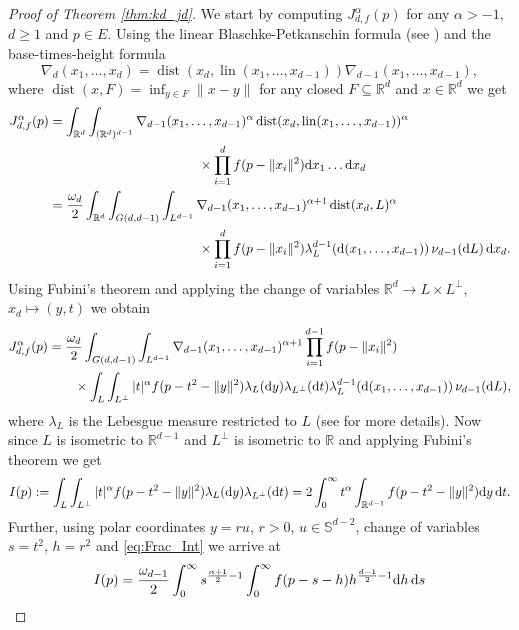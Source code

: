 \documentclass[11pt,a4paper]{article}
\theoremstyle{plain}
\theoremstyle{definition}
\theoremstyle{remark}
\newcommand{\dist}{\mathop{\mathrm{dist}}\nolimits}
\def\RR{\mathbb{R}}
\def\SS{\mathbb{S}}
\newcommand{\dd}{{\rm d}}
\newcommand{\lin}{\mathop{\mathrm{lin}}\nolimits}
\begin{document}
\begin{proof}[Proof of Theorem \ref{thm:kd_jd}]
    We start by computing $J_{d,f}^{\alpha}(p)$ for any $\alpha>-1$, $d\ge 1$ and $p\in E$. Using the linear Blaschke-Petkanschin formula (see \cite[Theorem 7.2.1]{SW}) and the base-times-height formula 
    \[
        \nabla_d(x_1,\ldots,x_d)=\dist(x_d,\lin(x_1,\ldots,x_{d-1}))\nabla_{d-1}(x_1,\ldots,x_{d-1}),
    \]
    where $\dist(x, F)=\inf_{y\in F}\|x-y\|$ for any closed $F\subseteq \RR^d$ and $x\in\RR^d$ we get
    \begin{align*}
        J_{d,f}^{\alpha}(p)
        &= \int_{\RR^d} \int_{(\RR^d)^{d-1}} \nabla_{d-1}(x_1,\dots,x_{d-1})^\alpha \dist(x_{d},\lin(x_1,\dots,x_{d-1}))^{\alpha} \\ &\hspace{4cm} \times \prod_{i=1}^{d}f(p-\|x_i\|^2) \dd x_1 \dots \dd x_d\\
        &= {\omega_d\over 2}\int_{\RR^d} \int_{G(d,d-1)}\int_{L^{d-1}} \nabla_{d-1}(x_1,\dots,x_{d-1})^{\alpha+1} \dist(x_{d},L)^{\alpha} \\ &\hspace{4cm} \times \prod_{i=1}^{d}f(p-\|x_i\|^2)\lambda_L^{d-1}(\dd (x_1,\dots,x_{d-1}))\,\nu_{d-1}(\dd L)\, \dd x_d.
    \end{align*}
    Using Fubini's theorem and applying the change of variables $\RR^d\to L\times L^{\perp}$, $x_d\mapsto (y,t)$ we obtain 
    \begin{align}\label{eq:29.05.24_1}        
        J_{d,f}^{\alpha}(p) &= {\omega_d\over 2}\int_{G(d,d-1)}\int_{L^{d-1}}\nabla_{d-1}(x_1,\dots,x_{d-1})^{\alpha+1} \prod_{i=1}^{d-1}f(p-\|x_i\|^2) \notag\\ 
        &\qquad \times \int_{L}\int_{L^{\perp}} |t|^{\alpha}f(p-t^2-\|y\|^2)\lambda_{L}(\dd y) \lambda_{L^{\perp}}(\dd t)\lambda_L^{d-1}(\dd (x_1,\dots,x_{d-1}))\,\nu_{d-1}(\dd L),
    \end{align}
    where $\lambda_L$ is the Lebesgue measure restricted to $L$ (see \cite{SW} for more details). Now since $L$ is isometric to $\RR^{d-1}$ and $L^{\perp}$ is isometric to $\RR$ and applying Fubini's theorem we get
    \[
        I(p):=\int_{L}\int_{L^{\perp}} |t|^{\alpha}f(p-t^2-\|y\|^2)\lambda_{L}(\dd y) \lambda_{L^{\perp}}(\dd t)=2\int_{0}^{\infty}t^{\alpha}\int_{\RR^{d-1}} f(p-t^2-\|y\|^2)\dd y\,\dd t.
    \]
    Further, using polar coordinates $y=ru$, $r>0$, $u\in\SS^{d-2}$, change of variables $s=t^2$, $h=r^2$ and \eqref{eq:Frac_Int} we arrive at
    \begin{align*}
        I(p)&={\omega_{d-1}\over 2}\int_{0}^{\infty}s^{{\alpha+1\over 2}-1}\int_{0}^{\infty} f(p-s-h) h^{{d-1\over 2}-1} \dd h\, \dd s\\

\end{align*}
\end{proof}
\end{document}
